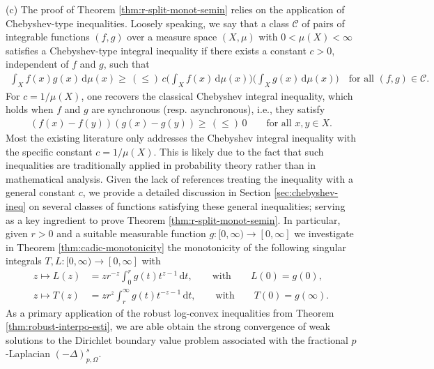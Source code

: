 \documentclass[12pt, reqno]{amsart}%
\theoremstyle{plain}  %
\theoremstyle{definition}  %
\theoremstyle{remark}
\numberwithin{equation}{section}
\renewcommand{\d}{\,\mathrm{d}}
\begin{document}
(c) The proof of Theorem \ref{thm:r-split-monot-semin} relies on the application of Chebyshev-type inequalities.  Loosely speaking, we say that a class $\mathcal{C}$ of pairs of integrable functions $(f,g)$ over a measure space $(X, \mu)$ with $0<\mu(X)<\infty$ satisfies a Chebyshev-type integral inequality if there exists a constant $c > 0$, independent of $f$ and $g$, such that
\begin{align*}
\int_X f(x)g(x)\d \mu (x) \geq \,  (\leq ) \, c \Big(\int_X f(x)\d \mu (x) \Big)\Big(\int_X g(x)\d \mu (x) \Big) \quad\text{for all $(f,g) \in \mathcal{C}$}.
\end{align*}
For $c = 1/\mu(X)$, one recovers the classical Chebyshev integral inequality, which holds when $f$ and $g$ are synchronous (resp. asynchronous), i.e., they satisfy
\begin{align*}
(f(x)-f(y))(g(x)-g(y))\geq \, (\leq )\, 0 \qquad  \text{for all $x,y\in X$}.
\end{align*}
Most the existing literature only addresses the Chebyshev integral inequality with the specific constant $c = 1/\mu(X)$. This is likely due to the fact that such inequalities are traditionally applied in probability theory rather than in mathematical analysis. Given the lack of references treating the inequality with a general constant $c$, we provide a detailed discussion in Section \ref{sec:chebyshev-ineq} on several classes of functions satisfying these general inequalities; serving as a key ingredient to prove Theorem \ref{thm:r-split-monot-semin}.  In particular, given $r>0$ and a suitable measurable function $g: [0,\infty)\to [0,\infty]$ we investigate  in Theorem \ref{thm:cadic-monotonicity} the monotonicity of the following singular integrals
$T,L: [0,\infty) \to[0,\infty]$ with
\begin{align*}
z\mapsto L(z)&= zr^{-z}\int_0^r  g(t)t^{z-1} \d t,
\qquad \text{with} \qquad  L(0)= g(0), \\
z\mapsto T(z)&= zr^{z} \int_r^\infty g(t) t^{-z-1} \d t,
\qquad \text{with} \qquad T(0)=g(\infty).
\end{align*}
As a primary application of the robust log-convex inequalities from Theorem \ref{thm:robust-interpo-esti}, we are able obtain the strong convergence of weak solutions to the Dirichlet boundary value problem associated with the fractional $p$-Laplacian $(-\Delta)^s_{p,\Omega}$.
\end{document}
